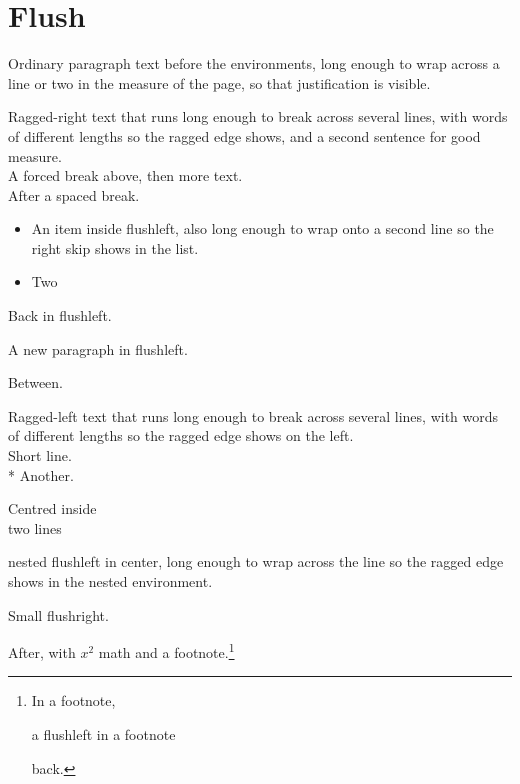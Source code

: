 \documentclass{article}
\begin{document}
\section{Flush}
Ordinary paragraph text before the environments, long enough to wrap across a line or two in the measure of the page, so that justification is visible.
\begin{flushleft}
Ragged-right text that runs long enough to break across several lines, with words of different lengths so the ragged edge shows, and a second sentence for good measure.\\
A forced break above, then more text.\\[6pt]
After a spaced break.
\begin{itemize}
\item An item inside flushleft, also long enough to wrap onto a second line so the right skip shows in the list.
\item Two
\end{itemize}
Back in flushleft.

A new paragraph in flushleft.
\end{flushleft}
Between.
\begin{flushright}
Ragged-left text that runs long enough to break across several lines, with words of different lengths so the ragged edge shows on the left.\\
Short line.\\*
Another.
\end{flushright}
\begin{center}
Centred inside\\ two lines
\begin{flushleft}
nested flushleft in center, long enough to wrap across the line so the ragged edge shows in the nested environment.
\end{flushleft}
\end{center}
{\small\begin{flushright}
Small flushright.
\end{flushright}}
After, with $x^2$ math and a footnote.\footnote{In a footnote, \begin{flushleft}a flushleft in a footnote\end{flushleft} back.}
\end{document}
